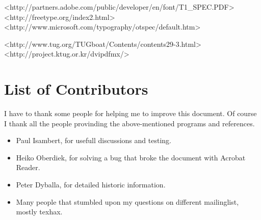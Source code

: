 	<http://partners.adobe.com/public/developer/en/font/T1_SPEC.PDF>
	<http://freetype.org/index2.html>
	<http://www.microsoft.com/typography/otspec/default.htm>

	<http://www.tug.org/TUGboat/Contents/contents29-3.html>
	<http://project.ktug.or.kr/dvipdfmx/>

\clearpage
\section{List of Contributors}
I have to thank some people for helping me to improve this document. Of course I thank all the people provinding the above-mentioned programs and references.

\begin{itemize}
\item Paul Isambert, for usefull discussions and testing.
\item Heiko Oberdiek, for solving a bug that broke the document with Acrobat Reader.
\item Peter Dyballa, for detailed historic information.
\item Many people that stumbled upon my questions on different mailinglist, mostly texhax.
\end{itemize}
